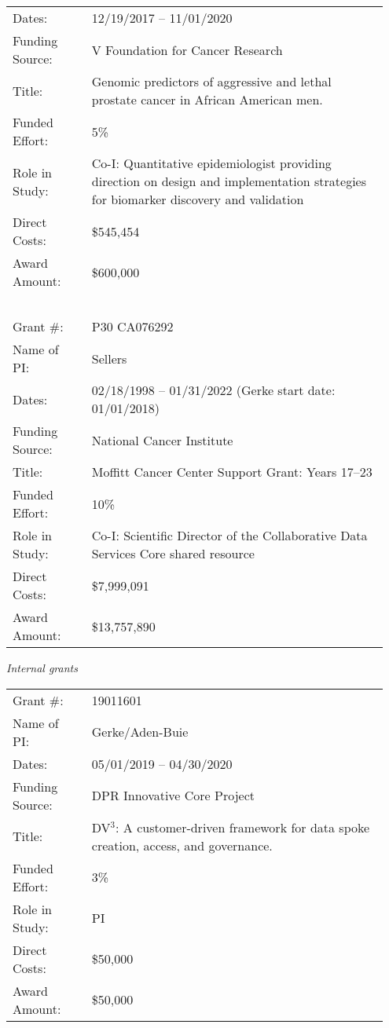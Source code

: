\documentclass[11pt, a4paper]{article} %
\begin{document}
\begin{longtable}{@{}p{0.2\linewidth} p{0.75\linewidth}}
Dates: & 12/19/2017 -- 11/01/2020\\
Funding Source: & V Foundation for Cancer Research\\
Title: & Genomic predictors of aggressive and lethal prostate cancer in African American men.\\
Funded Effort: & 5\%\\
Role in Study: & Co-I: Quantitative epidemiologist providing direction on design and implementation strategies for biomarker discovery and validation\\
Direct Costs: & \$545,454\\
Award Amount: & \$600,000\\
~\\
Grant \#: & P30 CA076292\\
Name of PI: & Sellers \\
Dates: & 02/18/1998 -- 01/31/2022 (Gerke start date: 01/01/2018)\\
Funding Source: & National Cancer Institute\\
Title: & Moffitt Cancer Center Support Grant: Years 17--23\\
Funded Effort: & 10\%\\
Role in Study: & Co-I: Scientific Director of the Collaborative Data Services Core shared resource\\
Direct Costs: & \$7,999,091\\
Award Amount: & \$13,757,890\\
\end{longtable}

\emph{Internal grants}
\begin{longtable}{@{}p{0.2\linewidth} p{0.75\linewidth}}
Grant \#: & 19011601\\
Name of PI: & Gerke/Aden-Buie \\
Dates: & 05/01/2019 -- 04/30/2020\\
Funding Source: & DPR Innovative Core Project\\
Title: & DV$^3$: A customer-driven framework for data spoke creation, access, and governance.\\
Funded Effort: & 3\% \\
Role in Study: & PI \\
Direct Costs: & \$50,000\\
Award Amount: & \$50,000\\
\end{longtable}
\end{document}
